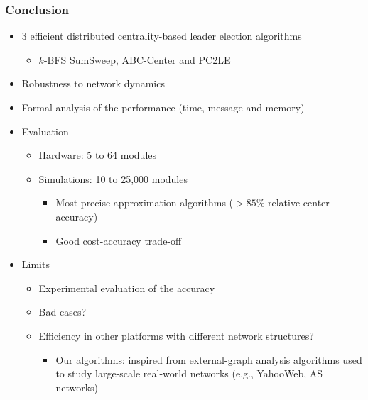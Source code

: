\begin{frame} \frametitle{Conclusion}

\begin{itemize}
	\item 3 efficient distributed centrality-based leader election algorithms
		\begin{itemize}
			\item $k$-BFS SumSweep, ABC-Center and PC2LE
		\end{itemize}
	\item Robustness to network dynamics
	\item Formal analysis of the performance (time, message and memory)
	\item Evaluation
		\begin{itemize}
			\item Hardware: 5 to 64 modules
			\item Simulations: 10 to 25,000 modules
			\begin{itemize}
				\item Most precise approximation algorithms ($> 85\%$ relative center accuracy)
				\item Good cost-accuracy trade-off 
			\end{itemize}
		\end{itemize}
	\item Limits
		\begin{itemize}
			\item Experimental evaluation of the accuracy
			\item Bad cases?
			\item Efficiency in other platforms with different network structures?
				\begin{itemize}
					\item Our algorithms: inspired from external-graph analysis algorithms used to study large-scale real-world networks (e.g., YahooWeb, AS networks)
				\end{itemize}
		\end{itemize}
\end{itemize}
\end{frame}